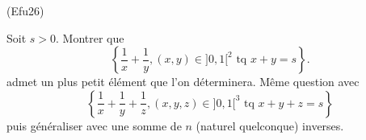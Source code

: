\begin{tiny}(Efu26)\end{tiny} Soit $s>0$. Montrer que
\begin{displaymath}
  \left\lbrace \frac{1}{x}+\frac{1}{y}, (x,y)\in ]0,1[^2 \text{ tq } x+y = s\right\rbrace .
\end{displaymath}
admet un plus petit élément que l'on déterminera.\newline
Même question avec
\begin{displaymath}
  \left\lbrace \frac{1}{x}+\frac{1}{y}+\frac{1}{z}, (x,y,z)\in ]0,1[^3 \text{ tq } x+y+z = s\right\rbrace 
\end{displaymath}
puis généraliser avec une somme de $n$ (naturel quelconque) inverses.
